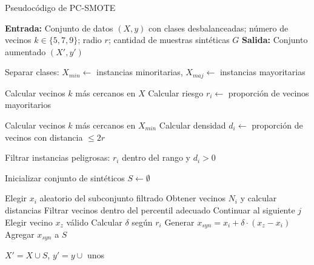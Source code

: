 \begin{algorithm}[H]
\caption{Pseudocódigo de PC-SMOTE}
\begin{algorithmic}[1]
\State \textbf{Entrada:} Conjunto de datos $(X, y)$ con clases desbalanceadas; número de vecinos $k \in \{5, 7, 9\}$; radio $r$; cantidad de muestras sintéticas $G$
\State \textbf{Salida:} Conjunto aumentado $(X', y')$

\State Separar clases: $X_{min} \gets$ instancias minoritarias, $X_{maj} \gets$ instancias mayoritarias

    \State Calcular vecinos $k$ más cercanos en $X$
    \State Calcular riesgo $r_i \gets$ proporción de vecinos mayoritarios
\EndFor

    \State Calcular vecinos $k$ más cercanos en $X_{min}$
    \State Calcular densidad $d_i \gets$ proporción de vecinos con distancia $\leq 2r$
\EndFor

\State Filtrar instancias peligrosas: $r_i$ dentro del rango y $d_i > 0$

\State Inicializar conjunto de sintéticos $S \gets \emptyset$

    \State Elegir $x_i$ aleatorio del subconjunto filtrado
    \State Obtener vecinos $N_i$ y calcular distancias
    \State Filtrar vecinos dentro del percentil adecuado
        \State Continuar al siguiente $j$
    \EndIf
    \State Elegir vecino $x_z$ válido
    \State Calcular $\delta$ según $r_i$
    \State Generar $x_{syn} = x_i + \delta \cdot (x_z - x_i)$
    \State Agregar $x_{syn}$ a $S$
\EndFor

\State \Return $X' = X \cup S$, $y' = y \cup$ unos
\end{algorithmic}
\end{algorithm}

